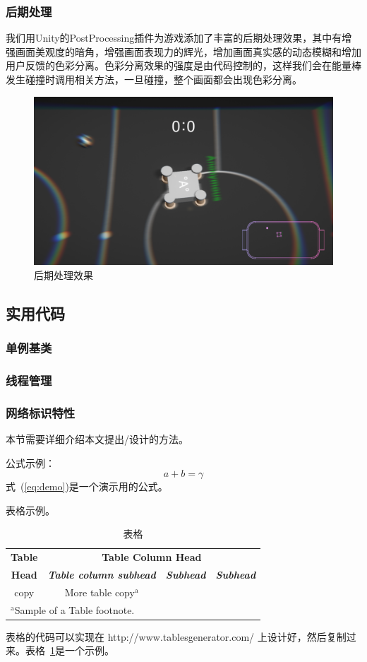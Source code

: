\documentclass[conference]{IEEEtran}
\begin{document}
\subsubsection{后期处理}
\quad

我们用Unity的PostProcessing插件为游戏添加了丰富的后期处理效果，其中有增强画面美观度的暗角，增强画面表现力的辉光，增加画面真实感的动态模糊和增加用户反馈的色彩分离。色彩分离效果的强度是由代码控制的，这样我们会在能量棒发生碰撞时调用相关方法，一旦碰撞，整个画面都会出现色彩分离。

\begin{figure}[htbp]
  \centerline{\includegraphics[width=.38\textwidth]{images/pp.png}}
  \caption{后期处理效果}
  \label{fig:pp}
\end{figure}

\subsection{实用代码}
\subsubsection{单例基类}
\subsubsection{线程管理}
\subsubsection{网络标识特性}

本节需要详细介绍本文提出/设计的方法。

公式示例：
\begin{equation}
a+b=\gamma\label{eq:demo}
\end{equation}
式~(\ref{eq:demo})是一个演示用的公式。

表格示例。
\begin{table}[htbp]
\caption{表格}
\begin{center}
\begin{tabular}{|c|c|c|c|}
\hline
\textbf{Table}&\multicolumn{3}{|c|}{\textbf{Table Column Head}} \\
\cline{2-4} 
\textbf{Head} & \textbf{\textit{Table column subhead}}& \textbf{\textit{Subhead}}& \textbf{\textit{Subhead}} \\
\hline
copy& More table copy$^{\mathrm{a}}$& &  \\
\hline
\multicolumn{4}{l}{$^{\mathrm{a}}$Sample of a Table footnote.}
\end{tabular}
\label{tbl:test}
\end{center}
\end{table}
表格的代码可以实现在 http://www.tablesgenerator.com/ 上设计好，然后复制过来。表格~\ref{tbl:test}是一个示例。
\end{document}
